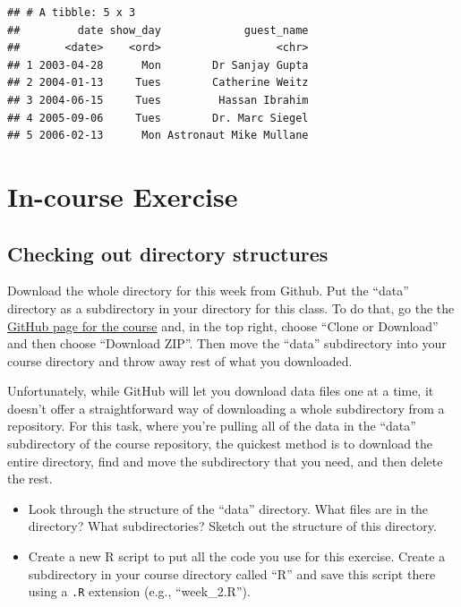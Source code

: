\documentclass[]{book}
\makeatletter
\providecommand{\tightlist}{%
  \setlength{\itemsep}{0pt}\setlength{\parskip}{0pt}}
\newenvironment{kframe}{%
\medskip{}
\setlength{\fboxsep}{.8em}
 \def\at@end@of@kframe{}%
 \ifinner\ifhmode%
  \def\at@end@of@kframe{\end{minipage}}%
  \begin{minipage}{\columnwidth}%
 \fi\fi%
 \def\FrameCommand##1{\hskip\@totalleftmargin \hskip-\fboxsep
 \colorbox{shadecolor}{##1}\hskip-\fboxsep
     \hskip-\linewidth \hskip-\@totalleftmargin \hskip\columnwidth}%
 \MakeFramed {\advance\hsize-\width
   \@totalleftmargin\z@ \linewidth\hsize
   \@setminipage}}%
 {\par\unskip\endMakeFramed%
 \at@end@of@kframe}
\newenvironment{rmdblock}[1]
  {
  \begin{itemize}
  \renewcommand{\labelitemi}{
    \raisebox{-.7\height}[0pt][0pt]{
      {\setkeys{Gin}{width=3em,keepaspectratio}\texttt{[image: images/\#1]}}
    }
  }
  \setlength{\fboxsep}{1em}
  \begin{kframe}
  \item
  }
  {
  \end{kframe}
  \end{itemize}
  }
\newenvironment{rmdnote}
  {\begin{rmdblock}{note}}
  {\end{rmdblock}}
\theoremstyle{definition}
\theoremstyle{definition}
\theoremstyle{definition}
\theoremstyle{remark}
\makeatother
\begin{document}
\begin{verbatim}
## # A tibble: 5 x 3
##         date show_day             guest_name
##       <date>    <ord>                  <chr>
## 1 2003-04-28      Mon        Dr Sanjay Gupta
## 2 2004-01-13     Tues        Catherine Weitz
## 3 2004-06-15     Tues         Hassan Ibrahim
## 4 2005-09-06     Tues        Dr. Marc Siegel
## 5 2006-02-13      Mon Astronaut Mike Mullane
\end{verbatim}

\section{In-course Exercise}\label{in-course-exercise-1}

\subsection{Checking out directory
structures}\label{checking-out-directory-structures}

Download the whole directory for this week from Github. Put the ``data''
directory as a subdirectory in your directory for this class. To do
that, go the the
\href{https://github.com/geanders/RProgrammingForResearch}{GitHub page
for the course} and, in the top right, choose ``Clone or Download'' and
then choose ``Download ZIP''. Then move the ``data'' subdirectory into
your course directory and throw away rest of what you downloaded.

\begin{rmdnote}
Unfortunately, while GitHub will let you download data files one at a
time, it doesn't offer a straightforward way of downloading a whole
subdirectory from a repository. For this task, where you're pulling all
of the data in the ``data'' subdirectory of the course repository, the
quickest method is to download the entire directory, find and move the
subdirectory that you need, and then delete the rest.
\end{rmdnote}

\begin{itemize}
\tightlist
\item
  Look through the structure of the ``data'' directory. What files are
  in the directory? What subdirectories? Sketch out the structure of
  this directory.
\item
  Create a new R script to put all the code you use for this exercise.
  Create a subdirectory in your course directory called ``R'' and save
  this script there using a \texttt{.R} extension (e.g., ``week\_2.R'').
\end{itemize}
\end{document}
